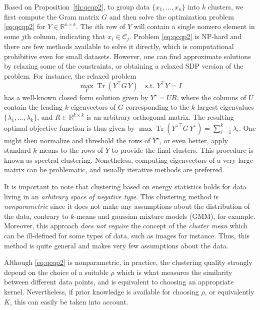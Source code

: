 \documentclass[aps,preprint,nofootinbib,floatfix]{revtex4-1}
\DeclareMathOperator{\Tr}{Tr}
\newcommand\C{{\mathcal{C}}}
\newcommand\Zt{Y}
\begin{document}
Based on Proposition~\ref{th:qcqp2}, to group data $\{ x_1,\dotsc,x_n \}$
into  $k$ clusters, we first compute the Gram matrix
$G$ and then 
solve the optimization problem \eqref{eq:qcqp2} for $\Zt \in
\mathbb{R}^{n\times k}$. The $i$th row
of $\Zt$ will contain a single nonzero element in some $j$th column,
indicating that $x_i \in \C_j$. 
Problem \eqref{eq:qcqp2} is NP-hard and there
are few methods
available to solve it directly,
which is computational prohibitive even for small datasets.
However, one can find approximate solutions by relaxing some 
of the constraints, or obtaining a relaxed SDP version of the problem. 
For instance, the relaxed problem
\begin{equation}
\max_{Y} \Tr \left( Y^\top G \, Y \right) \quad \mbox{s.t. $Y^\top Y = I$}
\end{equation}
has a well-known closed form solution given by $Y^\star = U R$, where the
columns of $U$ contain the leading $k$ eigenvectors of $G$ corresponding
to the $k$ largest eigenvalues $\{ \lambda_1,\dotsc,\lambda_k \}$, and
$R \in \mathbb{R}^{k\times k}$ is an arbitrary orthogonal matrix. 
The resulting
optimal objective function is thus given by
$\max \Tr \left( {Y^\star}^\top G \, Y^\star \right)  = 
\sum_{i=1}^k \lambda_i$. One might then normalize and threshold the rows
of $Y^\star$, or even better, apply standard $k$-means to the rows of
$Y$ to provide the final clusters. This procedure is known as spectral
clustering. Nonetheless, computing eigenvectors of a very large matrix
can be problematic, and usually iterative methods are preferred.

It is important to note 
that clustering based on energy statistics
holds for data living in an \emph{arbitrary space of negative type}.
This clustering method is
\emph{nonparametric} since it does not make any assumptions
about 
the distribution of the data,
contrary to $k$-means and gaussian mixture models (GMM), for example.
Moreover, this approach \emph{does not require} the concept of the 
\emph{cluster mean}
which can be ill-defined for some types of data, such as images for
instance. 
Thus, this method is quite general and makes very few
assumptions about the data.

Although \eqref{eq:qcqp2} is nonparametric, in practice,
the clustering quality strongly depend on the choice of a suitable
$\rho$ which is what measures the similarity between different data points,
and is equivalent to choosing an appropriate kernel.
Nevertheless, if prior knowledge is available for choosing $\rho$, 
or equivalently $K$,
this can easily be taken into account.
\end{document}
